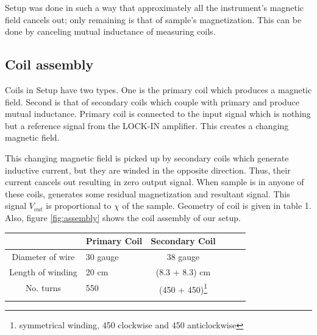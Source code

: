 Setup was done in such a way that approximately all the instrument's magnetic field cancels out; only remaining is that of sample’s magnetization.  This can be done by canceling mutual inductance of measuring coils. 
\subsection{Coil assembly}
Coils in Setup have two types. One is the primary coil which produces a magnetic field. Second is that of secondary coils which couple with primary and produce mutual inductance. Primary coil is connected to the input signal which is nothing but a reference signal from the LOCK-IN amplifier. This creates a changing magnetic field. 


This changing magnetic field is picked up by secondary coils which generate inductive current, but they are winded in the opposite direction. Thus, their current cancels out resulting in zero output signal. When sample is in anyone of these coils, generates some residual magnetization and resultant signal. This signal $V_{out}$ is proportional to $\chi$ of the sample. Geometry of coil is given in table 1. Also, figure \ref{fig:assembly} shows the coil assembly of our setup.

\noindent\setlength\tabcolsep{4pt}%
\begin{tabularx}{\linewidth}{|c|Y|c|Y|c|Y}
  \hline
  \hline
  & Primary Coil & Secondary Coil \\
  \hline
 Diameter of wire & 30 gauge & 38 gauge \\
 Length of winding & 20 cm & (8.3 + 8.3) cm \\
 No. turns & 550 & (450 + 450)\footnote{symmetrical winding, 450 clockwise and 450 anticlockwise}\\
 \hline
 \hline
 \caption{Geometry of coils in our setup}
 \label{geometry}
\end{tabularx}

